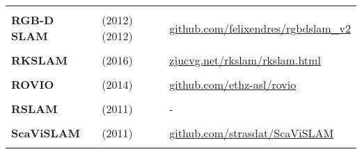 \documentclass[a4paper,12pt]{scrartcl}
\begin{document}
{\begin{longtable}{l|l|l}
                           &                                                                                             &                                                                       \\ [-3mm]
    \textbf{RGB-D SLAM}    & \cite{Endres2012} (2012) \cite{Endres2012a} (2012)                                          & {\url{github.com/felixendres/rgbdslam_v2}}                            \\
                           &                                                                                             &                                                                       \\ [-3mm]
    \textbf{RKSLAM}        & \cite{Liu2016} (2016)                                                                       & {\url{zjucvg.net/rkslam/rkslam.html}}                                 \\
                           &                                                                                             &                                                                       \\ [-3mm]
    \textbf{ROVIO}         & \cite{Bloesch2015} (2014)                                                                   & {\url{github.com/ethz-asl/rovio}}                                     \\
                           &                                                                                             &                                                                       \\ [-3mm]
    \textbf{RSLAM}         & \cite{Mei2011} (2011)                                                                       & -                                                                     \\
                           &                                                                                             &                                                                       \\ [-3mm]
    \textbf{ScaViSLAM}     & \cite{Strasdat2011} (2011)                                                                  & {\url{github.com/strasdat/ScaViSLAM}}                                 \\
                           &                                                                                             &                                                                       \\ [-3mm]

\end{longtable}}
\end{document}

